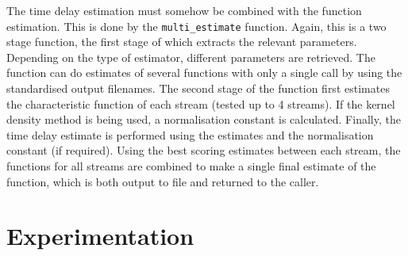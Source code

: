 \documentclass[a4paper,11pt]{article}
\begin{document}
   The time delay estimation must somehow be combined with the function
   estimation. This is done by the \texttt{multi\_estimate} function. Again, this
   is a two stage function, the first stage of which extracts the relevant
   parameters. Depending on the type of estimator, different parameters are
   retrieved. The function can do estimates of several functions with only a
   single call by using the standardised output filenames. The second stage of
   the function first estimates the characteristic function of each stream
   (tested up to 4 streams). If the kernel density method is being used, a
   normalisation constant is calculated. Finally, the time delay estimate is
   performed using the estimates and the normalisation constant (if
   required). Using the best scoring estimates between each stream, the
   functions for all streams are combined to make a single final estimate of the
   function, which is both output to file and returned to the caller.
\section{Experimentation}
\label{sec-8}
\end{document}
